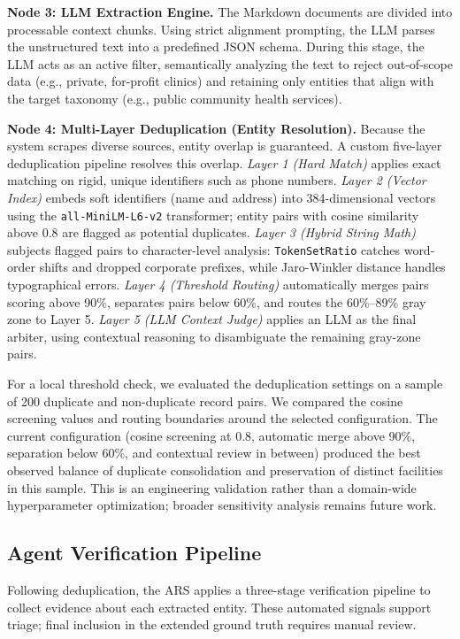 \documentclass[12pt,oneside]{report}
\begin{document}
\textbf{Node 3: LLM Extraction Engine.} The Markdown documents are divided into processable context chunks. Using strict alignment prompting, the LLM parses the unstructured text into a predefined JSON schema. During this stage, the LLM acts as an active filter, semantically analyzing the text to reject out-of-scope data (e.g., private, for-profit clinics) and retaining only entities that align with the target taxonomy (e.g., public community health services).

\textbf{Node 4: Multi-Layer Deduplication (Entity Resolution).} Because the system scrapes diverse sources, entity overlap is guaranteed. A custom five-layer deduplication pipeline resolves this overlap. \textit{Layer 1 (Hard Match)} applies exact matching on rigid, unique identifiers such as phone numbers. \textit{Layer 2 (Vector Index)} embeds soft identifiers (name and address) into 384-dimensional vectors using the \texttt{all-MiniLM-L6-v2} transformer; entity pairs with cosine similarity above 0.8 are flagged as potential duplicates. \textit{Layer 3 (Hybrid String Math)} subjects flagged pairs to character-level analysis: \texttt{TokenSetRatio} catches word-order shifts and dropped corporate prefixes, while Jaro-Winkler distance handles typographical errors. \textit{Layer 4 (Threshold Routing)} automatically merges pairs scoring above 90\%, separates pairs below 60\%, and routes the 60\%--89\% gray zone to Layer 5. \textit{Layer 5 (LLM Context Judge)} applies an LLM as the final arbiter, using contextual reasoning to disambiguate the remaining gray-zone pairs.

For a local threshold check, we evaluated the deduplication settings on a sample of 200 duplicate and non-duplicate record pairs. We compared the cosine screening values and routing boundaries around the selected configuration. The current configuration (cosine screening at 0.8, automatic merge above 90\%, separation below 60\%, and contextual review in between) produced the best observed balance of duplicate consolidation and preservation of distinct facilities in this sample. This is an engineering validation rather than a domain-wide hyperparameter optimization; broader sensitivity analysis remains future work.

\subsection{Agent Verification Pipeline}

Following deduplication, the ARS applies a three-stage verification pipeline to collect evidence about each extracted entity. These automated signals support triage; final inclusion in the extended ground truth requires manual review.
\end{document}

